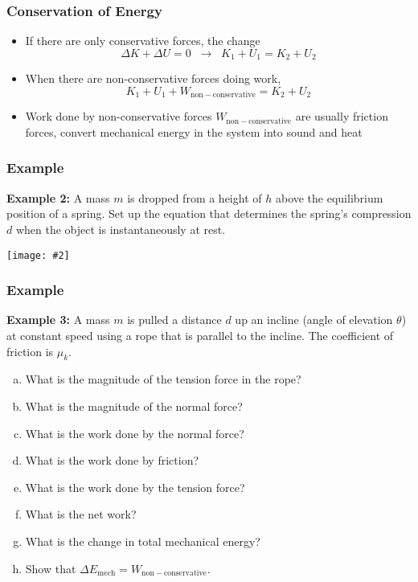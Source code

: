 \documentclass[12pt,compress,aspectratio=169]{beamer}
\newcommand{\pic}[2]{\texttt{[image: \#2]}}
\begin{document}
\begin{frame}
  \frametitle{Conservation of Energy}
  \begin{itemize}
  \item If there are only conservative forces, the change
    {\Large
    \begin{displaymath}
      \Delta K+\Delta U=0\;\;\rightarrow\;\; \boxed{K_1+U_1=K_2+U_2}
    \end{displaymath}
  }
  \item When there are non-conservative forces doing work, 
  {\Large
    \begin{displaymath}
      \boxed{K_1+U_1+W_\mathrm{non-conservative}=K_2+U_2}
    \end{displaymath}
  }
  \item Work done by non-conservative forces $W_\mathrm{non-conservative}$
    are usually friction forces, convert mechanical energy in the system into
    sound and heat
  \end{itemize}
\end{frame}

\begin{frame}
  \frametitle{Example}
  \textbf{Example 2:} A mass $m$ is dropped from a height of $h$ above the
  equilibrium position of a spring. Set up the equation that determines the
  spring's compression $d$ when the object is instantaneously at rest.
  \begin{center}
    \pic{.35}{spring-example1.png}
  \end{center}
\end{frame}


\begin{frame}
  \frametitle{Example}
  \textbf{Example 3:} A mass $m$ is pulled a distance $d$ up an incline (angle
  of elevation $\theta$) at constant speed using a rope that is parallel to
  the incline. The coefficient of friction is $\mu_k$.
  \begin{enumerate}[(a)]
  \item What is the magnitude of the tension force in the rope?
  \item What is the magnitude of the normal force?
  \item What is the work done by the normal force?
  \item What is the work done by friction?
  \item What is the work done by the tension force?
  \item What is the net work?
  \item What is the change in total mechanical energy?
  \item Show that $\Delta E_\mathrm{mech}=W_\mathrm{non-conservative}$.
  \end{enumerate}
\end{frame}
\end{document}
